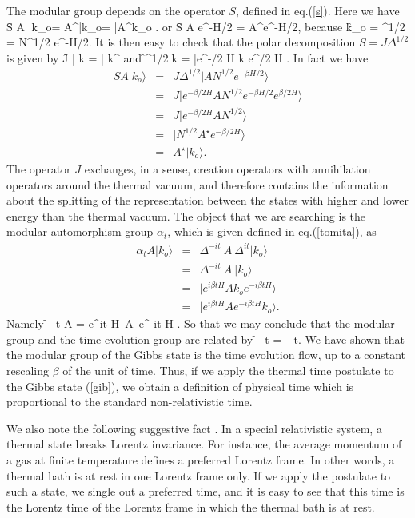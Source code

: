 The modular group depends on the operator $S$, defined in
eq.(\ref{s}). Here we have
\f
	S A |k_o\rangle = A^\star  |k_o\rangle = |A^\star k_o\rangle
{}.
\ff
or
\f
	S A  e^{-\beta H/2}  = A^\star e^{-\beta H/2},
\ff
because
\f
	k_o = \omega^{1/2} =  N^{1/2} e^{-\beta H/2}.
\ff
It is then easy to check that the polar decomposition  $S = J
\Delta^{1/2} $ is given by
\f
	J  | k \rangle= | k^\star \rangle
\ff
and
\f
	\Delta^{1/2}|k\rangle
	= |e^{-\beta/2  H} k e^{\beta/2  H} \rangle.
\ff
In fact we have
\begin{eqnarray}
	S A |k_o\rangle
	&=& J \Delta^{1/2} |A  N^{1/2} e^{-\beta H/2}\rangle
\nonumber \\
	&=& J |e^{-\beta/2  H} A  N^{1/2} e^{-\beta
		H/2}e^{\beta/2  H}\rangle
\nonumber  \\
	&=& J |e^{-\beta/2  H} A  N^{1/2}\rangle
\nonumber  \\
	&=&  |  N^{1/2} A^\star e^{-\beta/2  H}\rangle
\nonumber  \\
	&=& A^\star |k_o\rangle.
\end{eqnarray}
The operator $J$ exchanges, in a sense, creation operators with
annihilation operators around the thermal vacuum, and therefore
contains the information about the splitting of the representation
between the states with higher and lower energy than the thermal
vacuum. The object that we are searching is the modular
automorphism group $\alpha_t$, which is given defined in
eq.(\ref{tomita}), as
\begin{eqnarray}
	\alpha_t A |k_o\rangle
	&=&  \Delta^{-it}\ A\  \Delta^{it} |k_o\rangle
\nonumber  \\
	&=&  \Delta^{-it}\ A \ |k_o\rangle
\nonumber  \\
	&=&    |e^{i\beta t H} A k_o e^{-i\beta t H}\rangle
\nonumber  \\
	&=&   |e^{i\beta t H} A e^{-i\beta t H} k_o \rangle.
\end{eqnarray}
Namely
\f
	\alpha_t  A  = e^{i\beta t H}\ A\ e^{-i\beta t H} .
\ff
So that we may conclude that the modular group and the time
evolution group are related by
\f
	\alpha_t    = \gamma_{\beta t}.
\ff
We have shown that the modular group of the Gibbs state is the
time evolution flow, up to a constant rescaling $\beta$ of the
unit
of time.   Thus, if we apply the thermal time postulate to the
Gibbs state (\ref{gib}), we obtain a definition of physical time
which is proportional to the standard non-relativistic time.

We also note the following suggestive fact \cite{statistical2}. In
a special relativistic system, a thermal state breaks Lorentz
invariance.  For instance, the average momentum of a gas at
finite temperature defines a preferred Lorentz frame. In other
words, a thermal bath is at rest in one Lorentz frame only.  If we
apply the postulate to such a state, we single out a preferred
time, and it is easy to see that this time is the Lorentz time of
the Lorentz frame in which the thermal bath is at rest.

